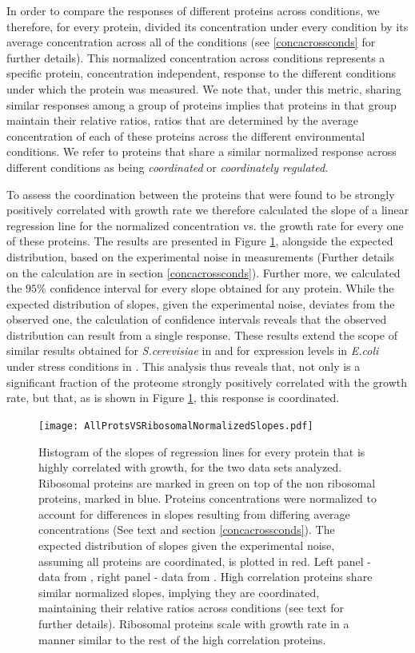 \documentclass[notitlepage]{article}
\begin{document}
In order to compare the responses of different proteins across conditions, we therefore, for every protein, divided its concentration under every condition by its average concentration across all of the conditions (see \ref{concacrossconds} for further details).
This normalized concentration across conditions represents a specific protein, concentration independent, response to the different conditions under which the protein was measured.
We note that, under this metric, sharing similar responses among a group of proteins implies that proteins in that group maintain their relative ratios, ratios that are determined by the average concentration of each of these proteins across the different environmental conditions.
We refer to proteins that share a similar normalized response across different conditions as being \emph{coordinated} or \emph{coordinately regulated}.

To assess the coordination between the proteins that were found to be strongly positively correlated with growth rate we therefore calculated the slope of a linear regression line for the normalized concentration vs. the growth rate for every one of these proteins.
The results are presented in Figure \ref{fig:globalfit}, alongside the expected distribution, based on the experimental noise in measurements (Further details on the calculation are in section \ref{concacrossconds}).
Further more, we calculated the $95\%$ confidence interval for every slope obtained for any protein.
While the expected distribution of slopes, given the experimental noise, deviates from the observed one, the calculation of confidence intervals reveals that the observed distribution can result from a single response.
These results extend the scope of similar results obtained for \emph{S.cerevisiae} in \cite{Keren2013a} and for expression levels in \emph{E.coli} under stress conditions in \cite{Kaneko2014}.
This analysis thus reveals that, not only is a significant fraction of the proteome strongly positively correlated with the growth rate, but that, as is shown in Figure \ref{fig:globalfit}, this response is coordinated.

\begin{figure}[h]
\centering
\texttt{[image: AllProtsVSRibosomalNormalizedSlopes.pdf]}
\caption{
    Histogram of the slopes of regression lines for every protein that is highly correlated with growth, for the two data sets analyzed.
    Ribosomal proteins are marked in green on top of the non ribosomal proteins, marked in blue.
    Proteins concentrations were normalized to account for differences in slopes resulting from differing average concentrations (See text and section \ref{concacrossconds}).
    The expected distribution of slopes given the experimental noise, assuming all proteins are coordinated, is plotted in red.
    Left panel - data from \cite{Valgepea2013}, right panel - data from \cite{Heinemann2014}.
    High correlation proteins share similar normalized slopes, implying they are coordinated, maintaining their relative ratios across conditions (see text for further details).
    Ribosomal proteins scale with growth rate in a manner similar to the rest of the high correlation proteins.
}
\label{fig:globalfit}
\end{figure}
\end{document}
